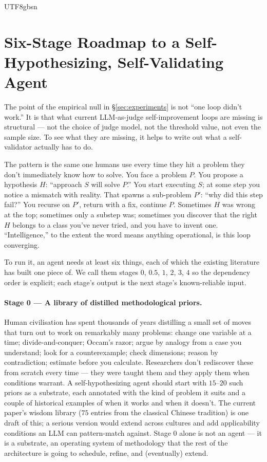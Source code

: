 \documentclass{article}
\begin{document}
\begin{CJK*}{UTF8}{gbsn}
\section{Six-Stage Roadmap to a Self-Hypothesizing,
Self-Validating Agent}
\label{sec:roadmap}

The point of the empirical null in \S\ref{sec:experiments} is not
``one loop didn't work.'' It is that what current LLM-as-judge
self-improvement loops are missing is structural --- not the
choice of judge model, not the threshold value, not even the
sample size. To see what they are missing, it helps to write
out what a self-validator actually has to do.

The pattern is the same one humans use every time they hit a
problem they don't immediately know how to solve. You face a
problem \(P\). You propose a hypothesis \(H\): ``approach \(S\)
will solve \(P\).'' You start executing \(S\); at some step
you notice a mismatch with reality. That spawns a sub-problem
\(P'\): ``why did this step fail?'' You recurse on \(P'\),
return with a fix, continue \(P\). Sometimes \(H\) was wrong at
the top; sometimes only a substep was; sometimes you discover
that the right \(H\) belongs to a class you've never tried, and
you have to invent one. ``Intelligence,'' to the extent the word
means anything operational, is this loop converging.

To run it, an agent needs at least six things, each of which the
existing literature has built one piece of. We call them stages
\(0\), \(0.5\), \(1\), \(2\), \(3\), \(4\) so the dependency
order is explicit; each stage's output is the next stage's
known-reliable input.

\paragraph{Stage 0 --- A library of distilled methodological
priors.} Human civilisation has spent thousands of years
distilling a small set of moves that turn out to work on
remarkably many problems: change one variable at a time;
divide-and-conquer; Occam's razor; argue by analogy from a
case you understand; look for a counterexample; check
dimensions; reason by contradiction; estimate before you
calculate. Researchers don't rediscover these from scratch every
time --- they were taught them and they apply them when conditions
warrant. A self-hypothesizing agent should start with
\(15\)--\(20\) such priors as a substrate, each annotated with
the kind of problem it suits and a couple of historical examples
of when it works and when it doesn't. The current paper's
wisdom library (\(75\) entries from the classical Chinese
tradition) is one draft of this; a serious version would extend
across cultures and add applicability conditions an LLM can
pattern-match against. Stage 0 alone is not an agent --- it is a
substrate, an operating system of methodology that the rest of
the architecture is going to schedule, refine, and (eventually)
extend.


\end{CJK*}
\end{document}
